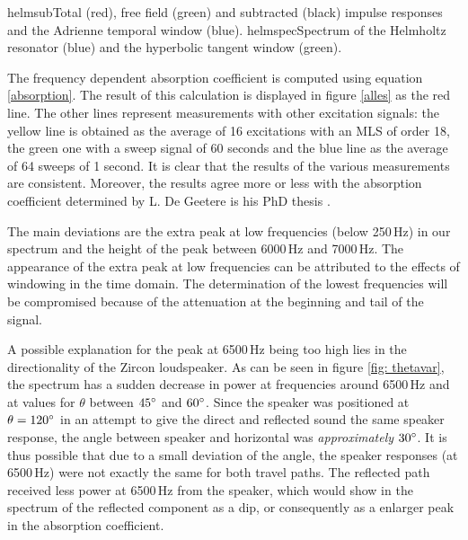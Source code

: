   

	{helmsub}{Total (red), free field (green) and subtracted (black) impulse responses and the Adrienne temporal window (blue).}
	{helmspec}{Spectrum of the Helmholtz resonator (blue) and the hyperbolic tangent window (green).}




The frequency dependent absorption coefficient is computed using equation \ref{absorption}. The result of this calculation is displayed in figure \ref{alles} as the red line. The other lines represent measurements with other excitation signals: the yellow line is obtained as the average of 16 excitations with an MLS of order 18, the green one with a sweep signal of 60 seconds and the blue line as the average of 64 sweeps of 1 second. It is clear that the results of the various measurements are consistent. Moreover, the results agree more or less with the absorption coefficient determined by L. De Geetere is his PhD thesis \cite[p.84]{Geetere}. 

The main deviations are the extra peak at low frequencies (below 250\,Hz) in our spectrum and the height of the peak between 6000\,Hz and 7000\,Hz. The appearance of the extra peak at low frequencies can be attributed to the effects of windowing in the time domain. The determination of the lowest frequencies will be compromised because of the attenuation at the beginning and tail of the signal.

A possible explanation for the peak at 6500\,Hz being too high lies in the directionality of the Zircon loudspeaker. As can be seen in figure \ref{fig: thetavar}, the spectrum has a sudden decrease in power at frequencies around 6500\,Hz and at values for $\theta$ between $45^{\circ}$ and $60^{\circ}$. Since the speaker was positioned at $\theta = 120^{\circ}$ in an attempt to give the direct and reflected sound the same speaker response, the angle between speaker and horizontal was \emph{approximately} $30^{\circ}$. It is thus possible that due to a small deviation of the angle, the speaker responses (at 6500\,Hz) were not exactly the same for both travel paths. The reflected path received less power at 6500\,Hz from the speaker, which would show in the spectrum of the reflected component as a dip, or consequently as a enlarger peak in the absorption coefficient.


